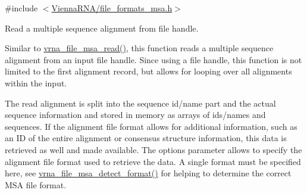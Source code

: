 {\ttfamily \#include $<$\hyperlink{file__formats__msa_8h}{Vienna\+R\+N\+A/file\+\_\+formats\+\_\+msa.\+h}$>$}



Read a multiple sequence alignment from file handle. 

Similar to \hyperlink{group__file__utils_gad02d5d12bda54611c915a1019323b7be}{vrna\+\_\+file\+\_\+msa\+\_\+read()}, this function reads a multiple sequence alignment from an input file handle. Since using a file handle, this function is not limited to the first alignment record, but allows for looping over all alignments within the input.

The read alignment is split into the sequence id/name part and the actual sequence information and stored in memory as arrays of ids/names and sequences. If the alignment file format allows for additional information, such as an ID of the entire alignment or consensus structure information, this data is retrieved as well and made available. The {\ttfamily options} parameter allows to specify the alignment file format used to retrieve the data. A single format must be specified here, see \hyperlink{group__file__utils_gade4fa8136ebb2d0f7eb3f8b59a8658e3}{vrna\+\_\+file\+\_\+msa\+\_\+detect\+\_\+format()} for helping to determine the correct M\+SA file format.

